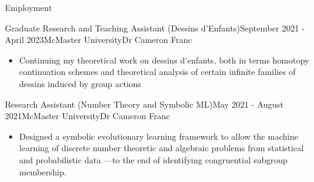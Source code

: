 \begin{rSection}{Employment}



\begin{rSubsection}{Graduate Research and Teaching Assistant (Dessins d'Enfants)}{September 2021 - April 2023}{McMaster University}{Dr Cameron Franc}
	\begin{itemize}
      \addtolength\itemsep{-0.5em}
      \item Continuing my theoretical work on dessins d'enfants, both in terms homotopy continuation schemes and theoretical analysis of certain infinite families of dessins induced by group actions
    \end{itemize}
\end{rSubsection}

\begin{rSubsection}{Research Assistant (Number Theory and Symbolic ML)}{May 2021 - August 2021}{McMaster University}{Dr Cameron Franc}
	\begin{itemize}
       \addtolength\itemsep{-0.5em}
      \item Designed a symbolic evolutionary learning framework to allow the machine learning  of discrete number theoretic and algebraic problems from statistical and probabilistic data ---to the end of identifying congruential subgroup membership.
    \end{itemize}
\end{rSubsection}


\end{rSection}
